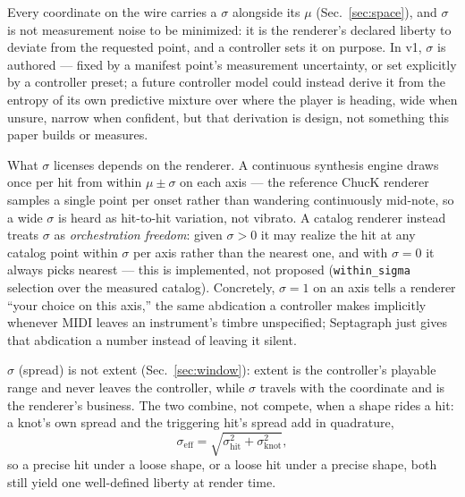 
Every coordinate on the wire carries a $\sigma$ alongside its $\mu$
(Sec.~\ref{sec:space}), and $\sigma$ is not measurement noise to be
minimized: it is the renderer's declared liberty to deviate from the
requested point, and a controller sets it on purpose. In v1, $\sigma$
is authored --- fixed by a manifest point's measurement uncertainty, or
set explicitly by a controller preset; a future controller model could
instead derive it from the entropy of its own predictive mixture over
where the player is heading, wide when unsure, narrow when confident,
but that derivation is design, not something this paper builds or
measures.

What $\sigma$ licenses depends on the renderer. A continuous synthesis
engine draws once per hit from within $\mu \pm \sigma$ on each axis ---
the reference ChucK renderer samples a single point per onset rather
than wandering continuously mid-note, so a wide $\sigma$ is heard as
hit-to-hit variation, not vibrato. A catalog renderer instead treats
$\sigma$ as \emph{orchestration freedom}: given $\sigma > 0$ it may
realize the hit at any catalog point within $\sigma$ per axis rather
than the nearest one, and with $\sigma = 0$ it always picks nearest ---
this is implemented, not proposed (\texttt{within\_sigma} selection over
the measured catalog). Concretely, $\sigma = 1$ on an axis tells a
renderer ``your choice on this axis,'' the same abdication a
controller makes implicitly whenever MIDI leaves an instrument's timbre
unspecified; Septagraph just gives that abdication a number instead of
leaving it silent.

$\sigma$ (spread) is not extent (Sec.~\ref{sec:window}): extent is the
controller's playable range and never leaves the controller, while
$\sigma$ travels with the coordinate and is the renderer's business.
The two combine, not compete, when a shape rides a hit: a knot's own
spread and the triggering hit's spread add in quadrature,
\begin{equation}
\sigma_{\mathrm{eff}} = \sqrt{\sigma_{\mathrm{hit}}^2 + \sigma_{\mathrm{knot}}^2},
\end{equation}
so a precise hit under a loose shape, or a loose hit under a precise
shape, both still yield one well-defined liberty at render time.
